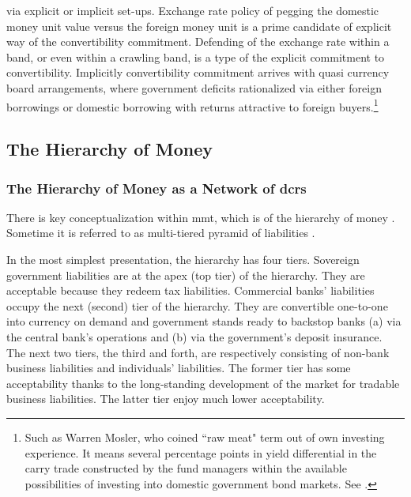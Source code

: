 via explicit or implicit set-ups. Exchange rate policy of pegging the
domestic money unit value versus the foreign money unit is a prime
candidate of explicit way of the convertibility commitment. Defending of
the exchange rate within a band, or even within a crawling band, is a
type of the explicit commitment to convertibility. Implicitly
convertibility commitment arrives with quasi currency board
arrangements, where government deficits rationalized via either foreign
borrowings or domestic borrowing with returns attractive to foreign
buyers.\footnote{Such as Warren Mosler, who coined ``raw meat" term out of own investing experience. It means several percentage points in yield differential in the carry trade constructed by the fund managers within the available possibilities of investing into domestic government bond markets. See \citep[p.~4]{mosler}.}

\subsection{The Hierarchy of Money}

\subsubsection{The Hierarchy of Money as a Network of \acp{dcr}}

There is key conceptualization within \ac{mmt}, which is of the hierarchy of
money \citep{bell}. Sometime it is referred to as multi-tiered pyramid of
liabilities \citep[p.~148]{wray2020}.

In the most simplest presentation, the hierarchy has four tiers.
Sovereign government liabilities are at the apex (top tier) of the
hierarchy. They are acceptable because they redeem tax liabilities.
Commercial banks' liabilities occupy the next (second) tier of the
hierarchy. They are convertible one-to-one into currency on demand and
government stands ready to backstop banks (a) via the central bank's
operations and (b) via the government's deposit insurance. The next two
tiers, the third and forth, are respectively consisting of non-bank
business liabilities and individuals' liabilities. The former tier has
some acceptability thanks to the long-standing development of the market
for tradable business liabilities. The latter tier enjoy much lower
acceptability.

